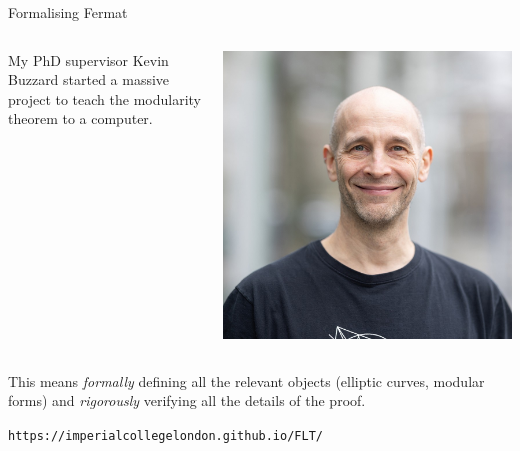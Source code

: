 \documentclass[10pt]{beamer}
\theoremstyle{definition}
\begin{document}
\begin{frame}[t]{Formalising Fermat}

\begin{columns}[T]

\begin{column}{0.8\textwidth}
My PhD supervisor Kevin Buzzard started a massive project to teach the modularity theorem to a computer.
\end{column}

\begin{column}{0.1\textwidth}
\begin{center}
\vspace{-1cm}
\hspace{-1cm}
\includegraphics[width=1.5\textwidth]{buzzard.jpg}
\end{center}
\end{column}

\end{columns}

\vspace{0.5cm} This means \emph{formally} defining all the relevant objects (elliptic curves, modular forms) and \emph{rigorously} verifying all the details of the proof.

\vspace{0.5cm}

\begin{center}
\texttt{https://imperialcollegelondon.github.io/FLT/}
\end{center}


\end{frame}
\end{document}
